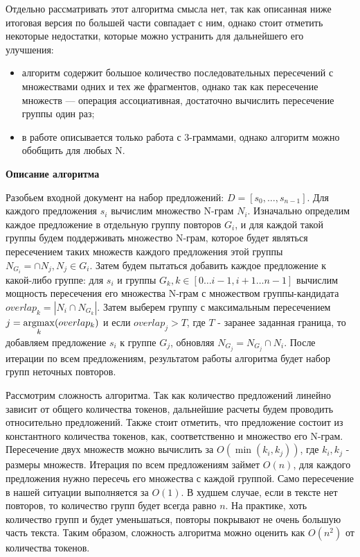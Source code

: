 \documentclass[14pt]{matmex-diploma-custom}
\begin{document}
Отдельно рассматривать этот алгоритма смысла нет, так как описанная ниже итоговая версия по большей части совпадает с ним, однако стоит отметить некоторые недостатки, которые можно устранить для дальнейшего его улучшения:

\begin{itemize}
	\item алгоритм содержит большое количество последовательных пересечений с множествами одних и тех же фрагментов, однако так как пересечение множеств --- операция ассоциативная, достаточно вычислить пересечение группы один раз;
	\item в работе описывается только работа с 3-граммами, однако алгоритм можно обобщить для любых N.
\end{itemize}

\textbf{Описание алгоритма}

Разобьем входной документ на набор предложений:	$D = [s_0,\dots,s_{n-1}]$. Для каждого предложения $s_i$ вычислим множество N-грам $N_i$. Изначально определим каждое предложение в отдельную группу повторов $G_i$, и для каждой такой группы будем поддерживать множество N-грам, которое будет являться пересечением таких множеств каждого предложения этой группы $N_{G_i} = \cap N_j, N_j\in G_i$. Затем будем пытаться добавить каждое предложение к какой-либо группе: для $s_i$ и группы $G_k, k\in[0\dots i-1, i+1\dots n-1]$ вычислим мощность пересечения его множества N-грам с множеством группы-кандидата $overlap_k = |N_i \cap N_{G_k}|$. Затем выберем группу с максимальным пересечением $j = \operatorname*{argmax}\limits_{k} (overlap_k)$ и если $overlap_j > T$, где $T$ - заранее заданная граница, то добавляем предложение $s_i$ к группе $G_j$, обновляя $N_{G_j} = N_{G_j} \cap N_i$. После итерации по всем предложениям, результатом работы алгоритма будет набор групп неточных повторов.

Рассмотрим сложность алгоритма. Так как количество предложений линейно зависит от общего количества токенов, дальнейшие расчеты будем проводить относительно предложений. Также стоит отметить, что предложение состоит из константного количества токенов, как, соответственно и множество его N-грам. Пересечение двух множеств можно вычислить за $O(\min(k_i, k_j))$, где $k_i, k_j$ - размеры множеств. Итерация по всем предложениям займет $O(n)$, для каждого предложения нужно пересечь его множества с каждой группой. Само пересечение в нашей ситуации выполняется за $O(1)$. В худшем случае, если в тексте нет повторов, то количество групп будет всегда равно $n$. На практике, хоть количество групп и будет уменьшаться, повторы покрывают не очень большую часть текста. Таким образом, сложность алгоритма можно оценить как $O(n^2)$ от количества токенов.
\end{document}
